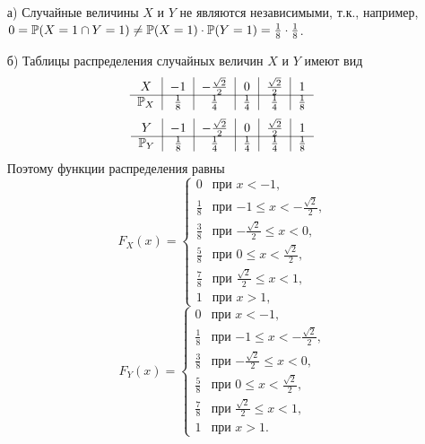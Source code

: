 \begin{enumerate}
\begin{enumerate}
\item[а)] Случайные величины $X$ и $Y$ не являются независимыми, т.к., например, $0 = \P(X=1 \cap Y=1) \not= \P(X=1) \cdot \P(Y=1) = \frac{1}{8} \cdot \frac{1}{8}$.

\item[б)] Таблицы распределения случайных величин $X$ и $Y$ имеют вид
\[
\begin{tabular}{c|c|c|c|c|c}
  $X$             & $-1$            & $-\frac{\sqrt{2}}{2}$     & $0$             & $\frac{\sqrt{2}}{2}$     & $1$    \\ \cline{1-6}
  $\P_X$  & $\frac{1}{8}$   & $\frac{1}{4}$             & $\frac{1}{4}$   & $\frac{1}{4}$            & $\frac{1}{8}$  \\
\end{tabular}
\]
\[
\begin{tabular}{c|c|c|c|c|c}
  $Y$             & $-1$            & $-\frac{\sqrt{2}}{2}$     & $0$             & $\frac{\sqrt{2}}{2}$     & $1$    \\ \cline{1-6}
  $\P_Y$  & $\frac{1}{8}$   & $\frac{1}{4}$             & $\frac{1}{4}$   & $\frac{1}{4}$            & $\frac{1}{8}$  \\
\end{tabular}
\]
Поэтому функции распределения равны
\[
F_X(x) =
                 \begin{cases}
                     0                           &   \text{при $x < -1$,} \\
                     \frac{1}{8}                 &   \text{при $-1 \leq x < -\frac{\sqrt{2}}{2}$,} \\
                     \frac{3}{8}                 &   \text{при $-\frac{\sqrt{2}}{2} \leq x < 0$,} \\
                     \frac{5}{8}                 &   \text{при $0 \leq x < \frac{\sqrt{2}}{2}$,} \\
                     \frac{7}{8}                 &   \text{при $\frac{\sqrt{2}}{2} \leq x < 1$,} \\
                     1                           &   \text{при $x > 1$,}
                  \end{cases}
\]
\[
F_Y(x) =
                 \begin{cases}
                     0                           &   \text{при $x < -1$,} \\
                     \frac{1}{8}                 &   \text{при $-1 \leq x < -\frac{\sqrt{2}}{2}$,} \\
                     \frac{3}{8}                 &   \text{при $-\frac{\sqrt{2}}{2} \leq x < 0$,} \\
                     \frac{5}{8}                 &   \text{при $0 \leq x < \frac{\sqrt{2}}{2}$,} \\
                     \frac{7}{8}                 &   \text{при $\frac{\sqrt{2}}{2} \leq x < 1$,} \\
                     1                           &   \text{при $x > 1$.}
                  \end{cases}
\]


\end{enumerate}
\end{enumerate}
